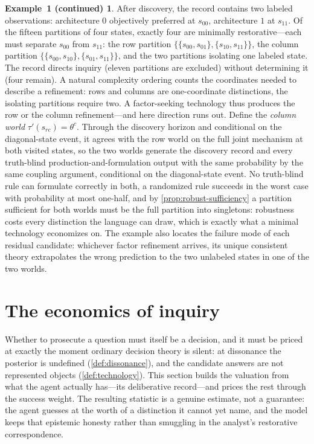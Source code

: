 \documentclass[11pt]{article}
\theoremstyle{definition}
\newtheorem*{excont}{Example~1 (continued)}
\begin{document}
\begin{excont}
After discovery, the record contains two labeled observations: architecture $0$ objectively preferred at $s_{00}$, architecture $1$ at $s_{11}$.
Of the fifteen partitions of four states, exactly four are minimally restorative---each must separate $s_{00}$ from $s_{11}$: the row partition $\{\{s_{00},s_{01}\},\{s_{10},s_{11}\}\}$, the column partition $\{\{s_{00},s_{10}\},\{s_{01},s_{11}\}\}$, and the two partitions isolating one labeled state.
The record directs inquiry (eleven partitions are excluded) without determining it (four remain).
A natural complexity ordering counts the coordinates needed to describe a refinement: rows and columns are one-coordinate distinctions, the isolating partitions require two.
A factor-seeking technology thus produces the row or the column refinement---and here direction runs out.
Define the \emph{column world} $\tau'(s_{rc})=\theta^{c}$.
Through the discovery horizon and conditional on the diagonal-state event, it agrees with the row world on the full joint mechanism at both visited states, so the two worlds generate the discovery record and every truth-blind production-and-formulation output with the same probability by the same coupling argument, conditional on the diagonal-state event.
No truth-blind rule can formulate correctly in both, a randomized rule succeeds in the worst case with probability at most one-half, and by \cref{prop:robust-sufficiency} a partition sufficient for both worlds must be the full partition into singletons: robustness costs every distinction the language can draw, which is exactly what a minimal technology economizes on.
The example also locates the failure mode of each residual candidate: whichever factor refinement arrives, its unique consistent theory extrapolates the wrong prediction to the two unlabeled states in one of the two worlds.
\end{excont}
\section{The economics of inquiry}
\label{sec:economics}

Whether to prosecute a question must itself be a decision, and it must be priced at exactly the moment ordinary decision theory is silent: at dissonance the posterior is undefined (\cref{def:dissonance}), and the candidate answers are not represented objects (\cref{def:technology}).
This section builds the valuation from what the agent actually has---its deliberative record---and prices the rest through the success weight.
The resulting statistic is a genuine estimate, not a guarantee: the agent guesses at the worth of a distinction it cannot yet name, and the model keeps that epistemic honesty rather than smuggling in the analyst's restorative correspondence.
\end{document}
